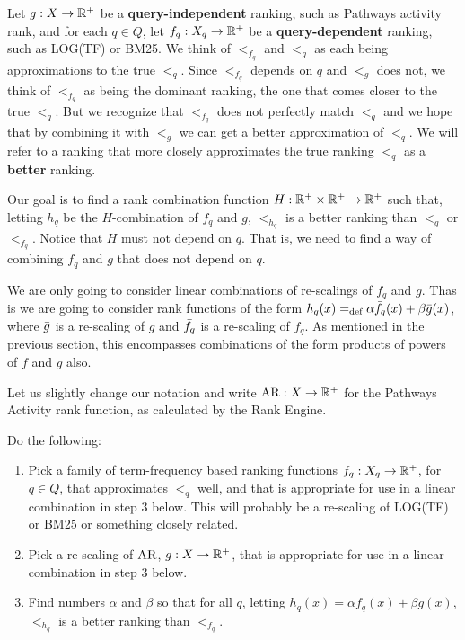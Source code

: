 \documentclass{article}
\begin{document}
Let $g:X\rightarrow\mathbb{R}^{+}$ be a \textbf{query-independent}
ranking, such as Pathways activity rank, and for each $q\in Q$, let $f_q:
X_q\rightarrow\mathbb{R}^{+}$ be a \textbf{query-dependent} ranking, such as LOG(TF) or BM25.
We think of $<_{f_q}$ and $<_g$ as each being approximations to the true $<_q$.
Since $<_{f_q}$ depends on $q$ and $<_g$ does not, we think of $<_{f_q}$ as
being the dominant ranking, the one that comes closer to the true $<_q$. But we
recognize that $<_{f_q}$ does not perfectly match $<_q$ and we hope that by
combining it with $<_g$ we can get a better approximation of $<_q$. We will
refer to a ranking that more closely approximates the true ranking $<_q$ as a
\textbf{better} ranking.


Our goal is to find a rank combination function
$H:\mathbb{R}^{+}\times\mathbb{R}^{+}\rightarrow\mathbb{R}^{+}$ such that, letting $h_q$ be the
$H$-combination
of $f_q$ and $g$, $<_{h_q}$ is a better ranking than $<_g$ or $<_{f_q}$.
Notice that $H$ must not depend on $q$. That is, we need
to find a way of combining $f_q$ and $g$ that does not depend on $q$.

We are only going to consider linear combinations of re-scalings of $f_q$ and
$g$. Thas is we are going to consider rank functions of the form $h_q(x)=_{\text{def}}\alpha
\bar{f}_q(x)+\beta \bar{g}(x)$, where $\bar{g}$ is a re-scaling of $g$ and $\bar{f}_q$ is
a re-scaling of $f_q$. As mentioned in the previous section, this encompasses
combinations of the form products of powers of $f$ and $g$ also.
 
 Let us slightly change our notation and write $\operatorname{AR}:X\rightarrow\mathbb{R}^{+}$ for the
 Pathways Activity
rank function, as calculated by the Rank Engine.
 
\begin{problem}
Do the following:
\begin{enumerate}
  \item Pick a family of term-frequency based ranking functions
  $f_q:X_q\rightarrow\mathbb{R}^{+}$, for $q\in Q$, that approximates
  $<_q$ well, and that is appropriate for use in a linear combination in step 3
  below. This will probably be a re-scaling of LOG(TF) or BM25 or something
  closely related.
  \item Pick a re-scaling of $\operatorname{AR}$, $g:X\rightarrow\mathbb{R}^{+}$, that is appropriate for use
  in a linear combination in step 3 below.
  \item Find numbers $\alpha$ and $\beta$ so that for all $q$, letting
  $h_q(x)=\alpha
  f_q(x)+\beta g(x)$, $<_{h_q}$ is a better ranking than $<_{f_q}$.
\end{enumerate}
\end{problem}
\end{document}
